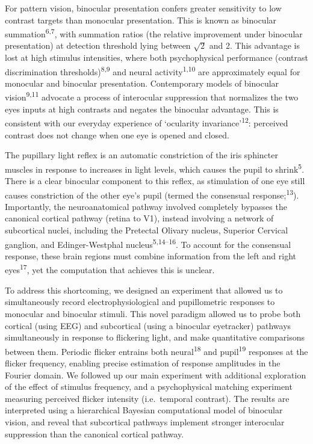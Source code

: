 \documentclass[
]{article}
\begin{document}
For pattern vision, binocular presentation confers greater sensitivity to low contrast targets than monocular presentation. This is known as binocular summation\textsuperscript{6,7}, with summation ratios (the relative improvement under binocular presentation) at detection threshold lying between \(\sqrt{2}\) and 2. This advantage is lost at high stimulus intensities, where both psychophysical performance (contrast discrimination thresholds)\textsuperscript{8,9} and neural activity\textsuperscript{1,10} are approximately equal for monocular and binocular presentation. Contemporary models of binocular vision\textsuperscript{9,11} advocate a process of interocular suppression that normalizes the two eyes inputs at high contrasts and negates the binocular advantage. This is consistent with our everyday experience of `ocularity invariance'\textsuperscript{12}: perceived contrast does not change when one eye is opened and closed.

The pupillary light reflex is an automatic constriction of the iris sphincter muscles in response to increases in light levels, which causes the pupil to shrink\textsuperscript{5}. There is a clear binocular component to this reflex, as stimulation of one eye still causes constriction of the other eye's pupil (termed the consensual response;\textsuperscript{13}). Importantly, the neuroanatomical pathway involved completely bypasses the canonical cortical pathway (retina to V1), instead involving a network of subcortical nuclei, including the Pretectal Olivary nucleus, Superior Cervical ganglion, and Edinger-Westphal nucleus\textsuperscript{5,14--16}. To account for the consensual response, these brain regions must combine information from the left and right eyes\textsuperscript{17}, yet the computation that achieves this is unclear.

To address this shortcoming, we designed an experiment that allowed us to simultaneously record electrophysiological and pupillometric responses to monocular and binocular stimuli. This novel paradigm allowed us to probe both cortical (using EEG) and subcortical (using a binocular eyetracker) pathways simultaneously in response to flickering light, and make quantitative comparisons between them. Periodic flicker entrains both neural\textsuperscript{18} and pupil\textsuperscript{19} responses at the flicker frequency, enabling precise estimation of response amplitudes in the Fourier domain. We followed up our main experiment with additional exploration of the effect of stimulus frequency, and a psychophysical matching experiment measuring perceived flicker intensity (i.e.~temporal contrast). The results are interpreted using a hierarchical Bayesian computational model of binocular vision, and reveal that subcortical pathways implement stronger interocular suppression than the canonical cortical pathway.
\end{document}
